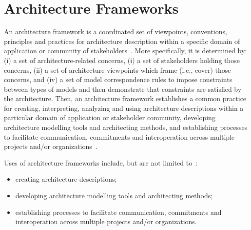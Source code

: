 \section{Architecture Frameworks}\label{sec:AAF}



An architecture framework is a
coordinated set of viewpoints, conventions, principles and practices
for architecture description within a specific domain of application
or community of stakeholders~\cite{42010}.  More specifically, it is determined by: (i) a set of architecture-related concerns,
(i) a set of stakeholders holding those concerns, (ii) a set of architecture viewpoints which frame (i.e.,
cover) those concerns, and (iv) a set of model correspondence rules to impose constraints between
types of models and then demonstrate that constraints
are satisfied by the architecture. 
Then, an architecture framework establishes a common practice for creating, interpreting, analyzing and using architecture descriptions within a particular domain of application or stakeholder community, developing
architecture modelling tools and architecting methods, and establishing processes to facilitate communication, commitments and interoperation across multiple projects and/or organizations~\cite{42010}.


Uses of architecture frameworks include, but are not limited to~\cite{42010}: 

\begin{itemize}
\item creating architecture descriptions; 
\item developing
architecture modelling tools and architecting methods; 
\item establishing processes to facilitate communication, commitments and interoperation across multiple projects and/or organizations.
\end{itemize}

